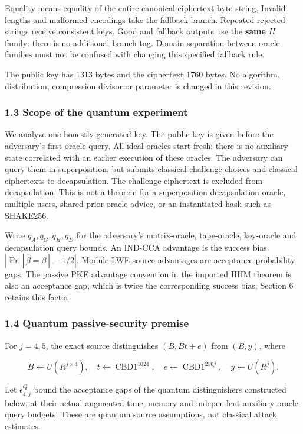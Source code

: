\documentclass[11pt,a4paper]{article}
\begin{document}
Equality means equality of the entire canonical ciphertext byte string. Invalid lengths and malformed encodings take the fallback branch. Repeated rejected strings receive consistent keys. Good and fallback outputs use the \textbf{same} \(H\) family: there is no additional branch tag. Domain separation between oracle families must not be confused with changing this specified fallback rule.

The public key has 1313 bytes and the ciphertext 1760 bytes. No algorithm, distribution, compression divisor or parameter is changed in this revision.

\subsubsection{1.3 Scope of the quantum experiment}\label{scope-of-the-quantum-experiment}

We analyze one honestly generated key. The public key is given before the adversary's first oracle query. All ideal oracles start fresh; there is no auxiliary state correlated with an earlier execution of these oracles. The adversary can query them in superposition, but submits classical challenge choices and classical ciphertexts to decapsulation. The challenge ciphertext is excluded from decapsulation. This is not a theorem for a superposition decapsulation oracle, multiple users, shared prior oracle advice, or an instantiated hash such as SHAKE256.

Write \(q_A,q_G,q_H,q_D\) for the adversary's matrix-oracle, tape-oracle, key-oracle and decapsulation query bounds. An IND-CCA advantage is the success bias \(|\Pr[\widehat\beta=\beta]-1/2|\). Module-LWE source advantages are acceptance-probability gaps. The passive PKE advantage convention in the imported HHM theorem is also an acceptance gap, which is twice the corresponding success bias; Section 6 retains this factor.

\subsubsection{1.4 Quantum passive-security premise}\label{quantum-passive-security-premise}

For \(j=4,5\), the exact source distinguishes \((B,Bt+e)\) from \((B,y)\), where

\[
B\leftarrow U(R^{j\times4}),\quad
t\leftarrow\operatorname{CBD1}^{1024},\quad
e\leftarrow\operatorname{CBD1}^{256j},\quad y\leftarrow U(R^j).
\]

Let \(\epsilon_{4,j}^{Q}\) bound the acceptance gaps of the quantum distinguishers constructed below, at their actual augmented time, memory and independent auxiliary-oracle query budgets. These are quantum source assumptions, not classical attack estimates.
\end{document}
